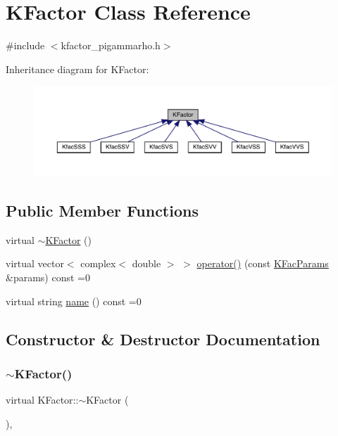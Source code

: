 \hypertarget{classKFactor}{}\section{K\+Factor Class Reference}
\label{classKFactor}


{\ttfamily \#include $<$kfactor\+\_\+pigammarho.\+h$>$}



Inheritance diagram for K\+Factor\+:\nopagebreak
\begin{figure}[H]
\begin{center}
\leavevmode
\includegraphics[width=350pt]{d0/d85/classKFactor__inherit__graph}
\end{center}
\end{figure}
\subsection*{Public Member Functions}
\begin{DoxyCompactItemize}
\item 
virtual \mbox{\hyperlink{classKFactor_a8a39c5bbfa86a5603d95af238845cfd9}{$\sim$\+K\+Factor}} ()
\item 
virtual vector$<$ complex$<$ double $>$ $>$ \mbox{\hyperlink{classKFactor_a012aae9ff4a07eab86d5d50b7f774285}{operator()}} (const \mbox{\hyperlink{classKFacParams}{K\+Fac\+Params}} \&params) const =0
\item 
virtual string \mbox{\hyperlink{classKFactor_ae578f8d6e4b525895427717da99cab6c}{name}} () const =0
\end{DoxyCompactItemize}


\subsection{Constructor \& Destructor Documentation}
\mbox{\label{classKFactor_a8a39c5bbfa86a5603d95af238845cfd9}} 
\subsubsection{\texorpdfstring{$\sim$KFactor()}{~KFactor()}}
{\footnotesize\ttfamily virtual K\+Factor\+::$\sim$\+K\+Factor (\begin{DoxyParamCaption}{ }\end{DoxyParamCaption})\hspace{0.3cm}{\ttfamily [inline]}, {\ttfamily [virtual]}}



